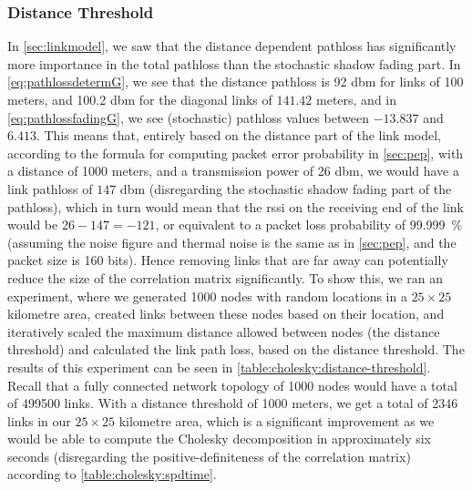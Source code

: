 \subsubsection{Distance Threshold}\label{sec:distancethreshold}
In \autoref{sec:linkmodel}, we saw that the distance dependent \gls{pathloss} has significantly more importance in the total \gls{pathloss} than the stochastic shadow fading part. In \autoref{eq:pathlossdetermG}, we see that the distance \gls{pathloss} is 92 \acrshort{dbm} for links of 100 meters, and 100.2 \acrshort{dbm} for the diagonal links of $141.42$ meters, and in \autoref{eq:pathlossfadingG}, we see (stochastic) \gls{pathloss} values between $-13.837$ and $6.413$. This means that, entirely based on the distance part of the link model, according to the formula for computing packet error probability in \autoref{sec:pep}, with a distance of 1000 meters, and a transmission power of 26 \acrshort{dbm}, we would have a link \gls{pathloss} of $147$ \acrshort{dbm} (disregarding the stochastic shadow fading part of the \gls{pathloss}), which in turn would mean that the \gls{rssi} on the receiving end of the link would be $26 - 147 = -121$, or equivalent to a packet loss probability of 99.999~\% (assuming the noise figure and thermal noise is the same as in \autoref{sec:pep}, and the packet size is 160 bits). Hence removing links that are far away can potentially reduce the size of the correlation matrix significantly. To show this, we ran an experiment, where we generated 1000 nodes with random locations in a $25 \times 25$ kilometre area, created links between these nodes based on their location, and iteratively scaled the maximum distance allowed between nodes (the distance threshold) and calculated the link path loss, based on the distance threshold. The results of this experiment can be seen in \autoref{table:cholesky:distance-threshold}. Recall that a fully connected network topology of 1000 nodes would have a total of 499500 links. With a distance threshold of 1000 meters, we get a total of 2346 links in our $25 \times 25$ kilometre area, which is a significant improvement as we would be able to compute the Cholesky decomposition in approximately six seconds (disregarding the positive-definiteness of the correlation matrix) according to \autoref{table:cholesky:spdtime}.


